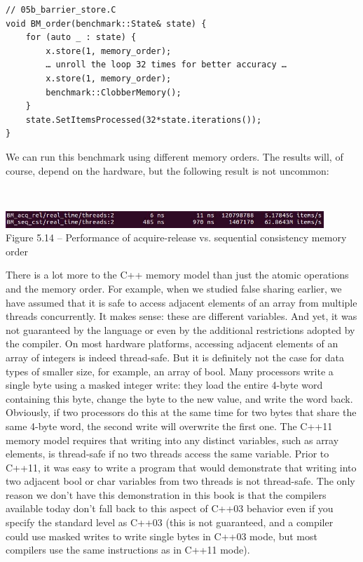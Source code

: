 \begin{lstlisting}[style=styleCXX]
// 05b_barrier_store.C
void BM_order(benchmark::State& state) {
	for (auto _ : state) {
		x.store(1, memory_order);
		… unroll the loop 32 times for better accuracy …
		x.store(1, memory_order);
		benchmark::ClobberMemory();
	}
	state.SetItemsProcessed(32*state.iterations());
}
\end{lstlisting}

We can run this benchmark using different memory orders. The results will, of course, depend on the hardware, but the following result is not uncommon:

\hspace*{\fill} \\ %
\begin{center}
\includegraphics[width=0.9\textwidth]{content/1/chapter5/images/14.jpg}\\
Figure 5.14 – Performance of acquire-release vs. sequential consistency memory order
\end{center}

There is a lot more to the C++ memory model than just the atomic operations and the memory order. For example, when we studied false sharing earlier, we have assumed that it is safe to access adjacent elements of an array from multiple threads concurrently. It makes sense: these are different variables. And yet, it was not guaranteed by the language or even by the additional restrictions adopted by the compiler. On most hardware platforms, accessing adjacent elements of an array of integers is indeed thread-safe. But it is definitely not the case for data types of smaller size, for example, an array of bool. Many processors write a single byte using a masked integer write: they load the entire 4-byte word containing this byte, change the byte to the new value, and write the word back. Obviously, if two processors do this at the same time for two bytes that share the same 4-byte word, the second write will overwrite the first one. The C++11 memory model requires that writing into any distinct variables, such as array elements, is thread-safe if no two threads access the same variable. Prior to C++11, it was easy to write a program that would demonstrate that writing into two adjacent bool or char variables from two threads is not thread-safe. The only reason we don't have this demonstration in this book is that the compilers available today don't fall back to this aspect of C++03 behavior even if you specify the standard level as C++03 (this is not guaranteed, and a compiler could use masked writes to write single bytes in C++03 mode, but most compilers use the same instructions as in C++11 mode).

